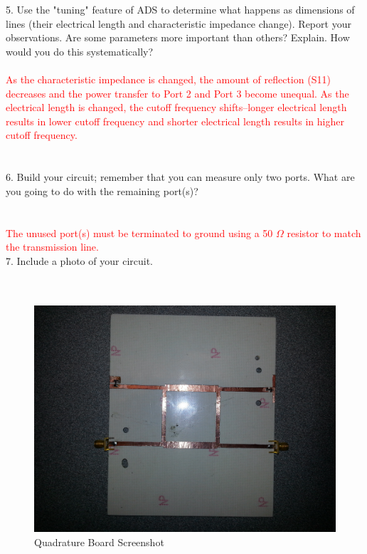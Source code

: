 \documentclass[conference]{IEEEtran}
\begin{document}
5. Use the "tuning" feature of ADS to determine what happens as dimensions of lines (their electrical length and characteristic impedance change). Report your observations. Are some parameters more important than others? Explain. How would you do this systematically?\\\\
\textcolor{red}{As the characteristic impedance is changed, the amount of reflection (S11) decreases and the power transfer to Port 2 and Port 3 become unequal.  As the electrical length is changed, the cutoff frequency shifts--longer electrical length results in lower cutoff frequency and shorter electrical length results in higher cutoff frequency.}\\\\\\
6. Build your circuit; remember that you can measure only two ports. What are you going to do with the remaining port(s)?\\\\\\
\textcolor{red}{The unused port(s) must be terminated to ground using a 50 $\Omega$ resistor to match the transmission line.}\\

7. Include a photo of your circuit.\\\\\
\begin{figure}[!h]
\centering
\includegraphics[scale=0.15]{quadrature-board.png}
\caption{Quadrature Board Screenshot}
\label{fig:board}
\end{figure}
\end{document}
